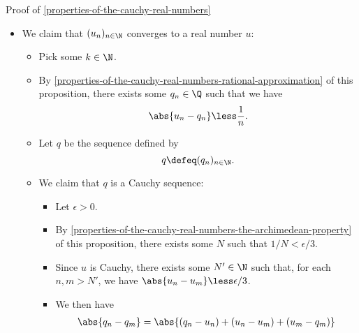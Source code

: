 \begin{Proof}{Proof of \cref{properties-of-the-cauchy-real-numbers}}
\begin{itemize}
\begin{itemize}
                \item This then gives
                    \begin{align*}
                        u_{n_{k}}-u_{n_{1}} &\greater k\epsilon\\%
                                            &\greater \epsilon'%
                    \end{align*}
                    for each $\epsilon'\greater0$, showing the sequence $(u_{n_{k}})_{k\in\N}$ to be unbounded.
                \item Since $(u_{n_{k}})_{k\in\N}$ is a subsequence of $(u_{n})_{n\in\N}$, this is a contradiction.
                \item Thus $(u_{n})_{n\in\N}$ is a Cauchy sequence.
            \end{itemize}
        \item We claim that $(u_{n})_{n\in\N}$ converges to a real number $u$:
            \begin{itemize}
                \item Pick some $k\in\N$.
                \item By \cref{properties-of-the-cauchy-real-numbers-rational-approximation} of this proposition, there exists some $q_{n}\in\Q$ such that we have
                    \[
                        \abs{u_{n}-q_{n}}%
                        \less%
                        \frac{1}{n}.%
                    \]%
                \item Let $q$ be the sequence defined by
                    \[
                        q%
                        \defeq%
                        (q_{n})_{n\in\N}.%
                    \]%
                \item We claim that $q$ is a Cauchy sequence:
                    \begin{itemize}
                        \item Let $\epsilon\greater0$.
                        \item By \cref{properties-of-the-cauchy-real-numbers-the-archimedean-property} of this proposition, there exists some $N$ such that $1/N\less\epsilon/3$.
                        \item Since $u$ is Cauchy, there exists some $N'\in\N$ such that, for each $n,m\greater N'$, we have $\abs{u_{n}-u_{m}}\less\epsilon/3$.
                        \item We then have
                            \begin{align*}
                                \abs{q_{n}-q_{m}} &=     \abs{(q_{n}-u_{n})+(u_{n}-u_{m})+(u_{m}-q_{m})}\\

\end{align*}
\end{itemize}
\end{itemize}
\end{itemize}
\end{Proof}
